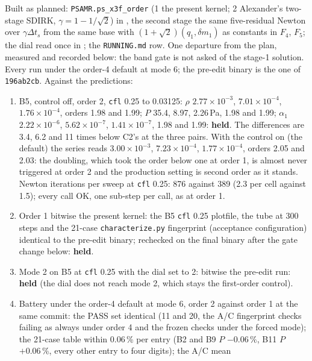 \documentclass[11pt,a4paper]{article}
\newcommand{\code}[1]{\texttt{\small #1}}
\newcommand{\Dt}{\Delta t}
\begin{document}
Built as planned: \code{PSAMR.ps\_x3f\_order} (1 the present kernel; 2
Alexander's two-stage SDIRK, $\gamma = 1 - 1/\sqrt2$) in
, the second stage the same five-residual Newton
over $\gamma\Dt_s$ from the same base with
$(1+\sqrt2)(q_1, \delta m_1)$ as constants in $F_4$, $F_5$; the dial
read once in ; the \code{RUNNING.md} row.  One
departure from the plan, measured and recorded below: the band gate is
not asked of the stage-1 solution.  Every run under the order-4 default
at mode 6; the pre-edit binary is the one of \code{196ab2cb}.  Against
the predictions:
\begin{enumerate}[nosep]
\item B5, control off, order 2, \code{cfl} 0.25 to 0.03125: $\rho$
      $2.77\times10^{-3}$, $7.01\times10^{-4}$, $1.76\times10^{-4}$,
      orders 1.98 and 1.99; $P$ 35.4, 8.97, 2.26\,Pa, 1.98 and 1.99;
      $\alpha_1$ $2.22\times10^{-6}$, $5.62\times10^{-7}$,
      $1.41\times10^{-7}$, 1.98 and 1.99: \textbf{held}.  The
      differences are 3.4, 6.2 and 11 times below C2's at the three
      pairs.  With the control on (the default) the series reads
      $3.00\times10^{-3}$, $7.23\times10^{-4}$, $1.77\times10^{-4}$,
      orders 2.05 and 2.03: the doubling, which took the order below
      one at order 1, is almost never triggered at order 2 and the
      production setting is second order as it stands.  Newton
      iterations per sweep at \code{cfl} 0.25: 876 against 389 (2.3
      per cell against 1.5); every call OK, one sub-step per call, as
      at order 1.
\item Order 1 bitwise the present kernel: the B5 \code{cfl} 0.25
      plotfile, the tube at 300 steps and the 21-case
      \code{characterize.py} fingerprint (acceptance configuration)
      identical to the pre-edit binary; rechecked on the final binary
      after the gate change below: \textbf{held}.
\item Mode 2 on B5 at \code{cfl} 0.25 with the dial set to 2: bitwise
      the pre-edit run: \textbf{held} (the dial does not reach mode 2,
      which stays the first-order control).
\item Battery under the order-4 default at mode 6, order 2 against
      order 1 at the same commit: the PASS set identical (11 and 20,
      the A/C fingerprint checks failing as always under order 4 and
      the frozen checks under the forced mode); the 21-case table
      within 0.06\,\% per entry (B2 and B9 $P$ $-0.06\,\%$, B11 $P$
      $+0.06\,\%$, every other entry to four digits); the A/C mean

\end{enumerate}
\end{document}
